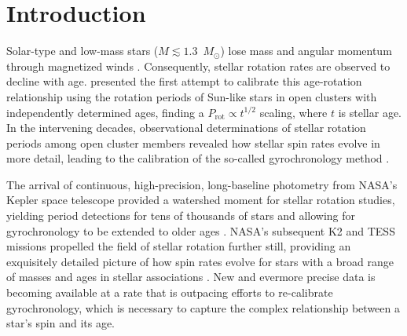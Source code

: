 \documentclass[twocolumn]{aastex631}
\newcommand{\msun}{$M_\odot$\xspace}
\begin{document}
\section{Introduction} \label{sec:intro}
Solar-type and low-mass stars ($M\lesssim1.3$~\msun) lose mass and angular momentum through magnetized winds \citep{Parker1958, WeberDavis1967, Mestel1968, Kawaler1988}. Consequently, stellar rotation rates are observed to decline with age. \citet{Skumanich1972} presented the first attempt to calibrate this age-rotation relationship using the rotation periods of Sun-like stars in open clusters with independently determined ages, finding a $P_\mathrm{rot} \propto t^{1/2}$ scaling, where $t$ is stellar age. In the intervening decades, observational determinations of stellar rotation periods among open cluster members revealed how stellar spin rates evolve in more detail, leading to the calibration of the so-called gyrochronology method \citep{Barnes2003, Barnes2007, Barnes2010, MamajekHillenbrand2008, Meibom2009}.

The arrival of continuous, high-precision, long-baseline photometry from NASA's Kepler space telescope \citep{Borucki2010} provided a watershed moment for stellar rotation studies, yielding period detections for tens of thousands of stars \citep[e.g.][]{Reinhold2013, McQuillan2014, Santos2021} and allowing for gyrochronology to be extended to older ages \citep[e.g.][]{Meibom2011, Meibom2015}. NASA's subsequent K2 \citep{Howell2014} and TESS \citep{Ricker2015} missions propelled the field of stellar rotation further still, providing an exquisitely detailed picture of how spin rates evolve for stars with a broad range of masses and ages in stellar associations \citep[e.g.][]{Douglas2016, Douglas2017, Douglas2019, Rebull2016, Rebull2017, Rebull2018, Rebull2020, Curtis2019a, Curtis2019b, Curtis2020}. New and evermore precise data is becoming available at a rate that is outpacing efforts to re-calibrate gyrochronology, which is necessary to capture the complex relationship between a star's spin and its age. 

\end{document}
